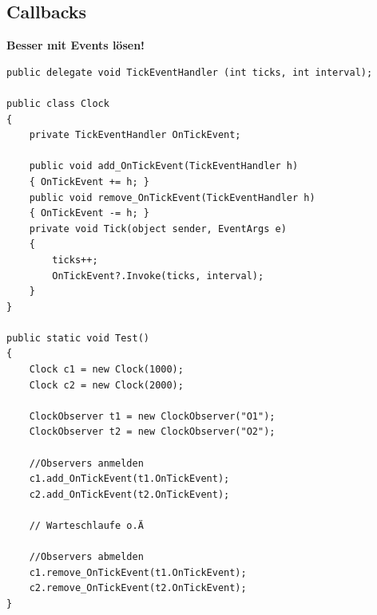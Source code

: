 \documentclass[
a4paper,
oneside,
10pt,
fleqn,
headsepline,
toc=listofnumbered, 
bibliography=totocnumbered]{scrartcl}
\begin{document}
\subsection{Callbacks}
\textbf{Besser mit Events lösen!}
\begin{lstlisting}
public delegate void TickEventHandler (int ticks, int interval);

public class Clock
{
    private TickEventHandler OnTickEvent;

    public void add_OnTickEvent(TickEventHandler h)
    { OnTickEvent += h; }
    public void remove_OnTickEvent(TickEventHandler h)
    { OnTickEvent -= h; }
    private void Tick(object sender, EventArgs e)
    {
        ticks++;
        OnTickEvent?.Invoke(ticks, interval);
    }
}

public static void Test()
{
    Clock c1 = new Clock(1000);
    Clock c2 = new Clock(2000);
    
    ClockObserver t1 = new ClockObserver("O1");
    ClockObserver t2 = new ClockObserver("O2");
    
    //Observers anmelden
    c1.add_OnTickEvent(t1.OnTickEvent);
    c2.add_OnTickEvent(t2.OnTickEvent);
    
    // Warteschlaufe o.Ä
    
    //Observers abmelden
    c1.remove_OnTickEvent(t1.OnTickEvent);
    c2.remove_OnTickEvent(t2.OnTickEvent);
}
\end{lstlisting}

\clearpage
\end{document}
